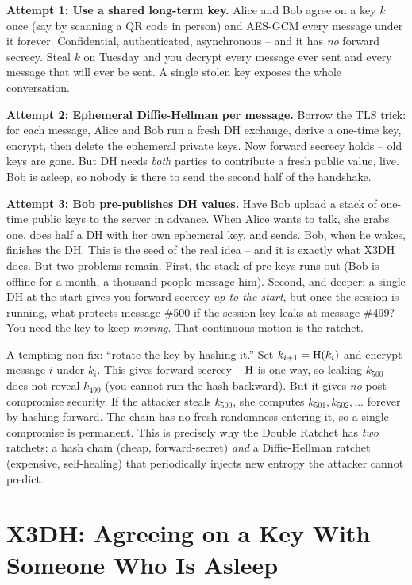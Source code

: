 \textbf{Attempt 1: Use a shared long-term key.} Alice and Bob agree on a key $k$ once (say by scanning a QR code in person) and AES-GCM every message under it forever. Confidential, authenticated, asynchronous -- and it has \emph{no} forward secrecy. Steal $k$ on Tuesday and you decrypt every message ever sent and every message that will ever be sent. A single stolen key exposes the whole conversation.

\textbf{Attempt 2: Ephemeral Diffie-Hellman per message.} Borrow the TLS trick: for each message, Alice and Bob run a fresh DH exchange, derive a one-time key, encrypt, then delete the ephemeral private keys. Now forward secrecy holds -- old keys are gone. But DH needs \emph{both} parties to contribute a fresh public value, live. Bob is asleep, so nobody is there to send the second half of the handshake.

\textbf{Attempt 3: Bob pre-publishes DH values.} Have Bob upload a stack of one-time public keys to the server in advance. When Alice wants to talk, she grabs one, does half a DH with her own ephemeral key, and sends. Bob, when he wakes, finishes the DH. This is the seed of the real idea -- and it is exactly what X3DH does. But two problems remain. First, the stack of pre-keys runs out (Bob is offline for a month, a thousand people message him). Second, and deeper: a single DH at the start gives you forward secrecy \emph{up to the start}, but once the session is running, what protects message \#500 if the session key leaks at message \#499? You need the key to keep \emph{moving}. That continuous motion is the ratchet.

\begin{trapbox}
A tempting non-fix: ``rotate the key by hashing it.'' Set $k_{i+1} = \operatorname{H}(k_i)$ and encrypt message $i$ under $k_i$. This gives forward secrecy -- $\operatorname{H}$ is one-way, so leaking $k_{500}$ does not reveal $k_{499}$ (you cannot run the hash backward). But it gives \emph{no} post-compromise security. If the attacker steals $k_{500}$, she computes $k_{501}, k_{502}, \dots$ forever by hashing forward. The chain has no fresh randomness entering it, so a single compromise is permanent. This is precisely why the Double Ratchet has \emph{two} ratchets: a hash chain (cheap, forward-secret) \emph{and} a Diffie-Hellman ratchet (expensive, self-healing) that periodically injects new entropy the attacker cannot predict.
\end{trapbox}

\section{X3DH: Agreeing on a Key With Someone Who Is Asleep}
\label{ch27:x3dh}

